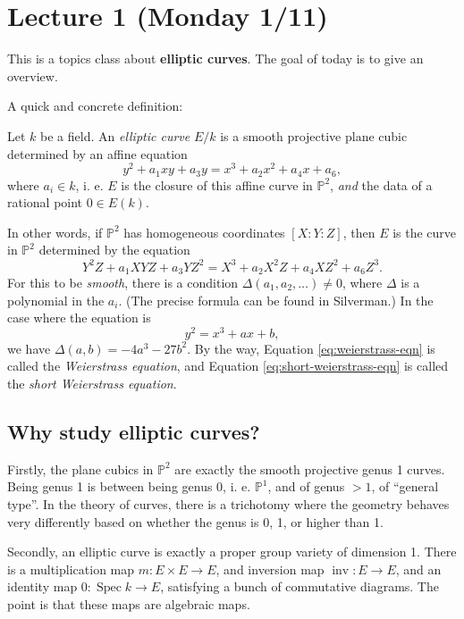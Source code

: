 \section{Lecture 1 (Monday 1/11)}
This is a topics class about \textbf{elliptic curves}.
The goal of today is to give an overview.

A quick and concrete definition:
\begin{definition}
  Let \( k \) be a field. An \textit{elliptic curve} \( E/k \) is a smooth projective plane cubic determined by an affine equation
  \begin{equation}\label{eq:weierstrass-eqn} y^2 + a_1 xy + a_3 y = x^3 + a_2 x^2 + a_4 x + a_6 , \end{equation}
  where \( a_i \in k \), i. e. \( E \) is the closure of this affine curve in \( \mathbb{P}^2 \), \textit{and} the data of a rational point \( 0 \in E(k) \).
\end{definition}
In other words, if \( \mathbb{P}^2 \) has homogeneous coordinates \( [X : Y : Z] \), then \( E \) is the curve in \( \mathbb{P}^2 \) determined by the equation
\[ Y^2 Z + a_1 XYZ + a_3 YZ^2 = X^3 + a_2 X^2 Z + a_4 XZ^2 + a_6 Z^3 . \]
For this to be \textit{smooth}, there is a condition \( \Delta( a_1,a_2,\dots) \neq 0 \), where \( \Delta \) is a polynomial in the \( a_i \).
(The precise formula can be found in Silverman.)
In the case where the equation is \begin{equation}\label{eq:short-weierstrass-eqn} y^2 = x^3 + ax + b , \end{equation}
we have \( \Delta(a,b) = - 4a^3 - 27b^2 . \)
By the way, Equation \ref{eq:weierstrass-eqn} is called the \textit{Weierstrass equation}, and Equation \ref{eq:short-weierstrass-eqn} is called the \textit{short Weierstrass equation}.

\subsection{Why study elliptic curves?}
Firstly, the plane cubics in \( \mathbb{P}^2 \) are exactly the smooth projective genus 1 curves.
Being genus 1 is between being genus 0, i. e. \( \mathbb{P}^1 \), and of genus \( >1 \), of ``general type''.
In the theory of curves, there is a trichotomy where the geometry behaves very differently based on whether the genus is 0, 1, or higher than 1.

Secondly, an elliptic curve is exactly a proper group variety of dimension 1.
There is a multiplication map \( m \colon E \times E\to E \), and inversion map \( \operatorname{inv} \colon E \to E \), and an identity map \( 0 \colon \operatorname{Spec}k \to E \), satisfying a bunch of commutative diagrams.
The point is that these maps are algebraic maps.

